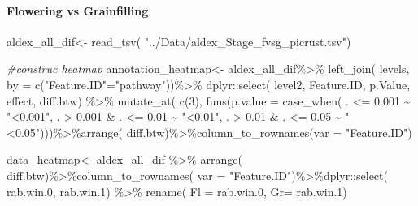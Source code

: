 \documentclass[]{interact}
\theoremstyle{plain}%
\theoremstyle{definition}
\theoremstyle{remark}
\newenvironment{Shaded}{\begin{snugshade}}{\end{snugshade}}
\newcommand{\AttributeTok}[1]{\textcolor[rgb]{0.77,0.63,0.00}{#1}}
\newcommand{\CommentTok}[1]{\textcolor[rgb]{0.56,0.35,0.01}{\textit{#1}}}
\newcommand{\DecValTok}[1]{\textcolor[rgb]{0.00,0.00,0.81}{#1}}
\newcommand{\FloatTok}[1]{\textcolor[rgb]{0.00,0.00,0.81}{#1}}
\newcommand{\FunctionTok}[1]{\textcolor[rgb]{0.00,0.00,0.00}{#1}}
\newcommand{\NormalTok}[1]{#1}
\newcommand{\OtherTok}[1]{\textcolor[rgb]{0.56,0.35,0.01}{#1}}
\newcommand{\SpecialCharTok}[1]{\textcolor[rgb]{0.00,0.00,0.00}{#1}}
\newcommand{\StringTok}[1]{\textcolor[rgb]{0.31,0.60,0.02}{#1}}
\begin{document}
\hypertarget{flowering-vs-grainfilling}{%
\paragraph{Flowering vs Grainfilling}\label{flowering-vs-grainfilling}}

\begin{Shaded}
\begin{Highlighting}[]
\NormalTok{aldex\_all\_dif}\OtherTok{\textless{}{-}} \FunctionTok{read\_tsv}\NormalTok{( }\StringTok{"../Data/aldex\_Stage\_fvsg\_picrust.tsv"}\NormalTok{)}


\CommentTok{\#construc heatmap}
\NormalTok{annotation\_heatmap}\OtherTok{\textless{}{-}}\NormalTok{ aldex\_all\_dif}\SpecialCharTok{\%\textgreater{}\%} \FunctionTok{left\_join}\NormalTok{(}
\NormalTok{  levels, }\AttributeTok{by =} \FunctionTok{c}\NormalTok{(}\StringTok{"Feature.ID"}\OtherTok{=}\StringTok{"pathway"}\NormalTok{))}\SpecialCharTok{\%\textgreater{}\%}\NormalTok{ dplyr}\SpecialCharTok{::}\FunctionTok{select}\NormalTok{(}
\NormalTok{  level2, Feature.ID, p.Value, effect, diff.btw) }\SpecialCharTok{\%\textgreater{}\%} \FunctionTok{mutate\_at}\NormalTok{(}
  \FunctionTok{c}\NormalTok{(}\DecValTok{3}\NormalTok{), }\FunctionTok{funs}\NormalTok{(}\AttributeTok{p.value =} \FunctionTok{case\_when}\NormalTok{(}
\NormalTok{  . }\SpecialCharTok{\textless{}=} \FloatTok{0.001} \SpecialCharTok{\textasciitilde{}} \StringTok{"\textless{}0.001"}\NormalTok{,}
\NormalTok{  . }\SpecialCharTok{\textgreater{}}  \FloatTok{0.001} \SpecialCharTok{\&}\NormalTok{ .  }\SpecialCharTok{\textless{}=} \FloatTok{0.01} \SpecialCharTok{\textasciitilde{}} \StringTok{"\textless{}0.01"}\NormalTok{,}
\NormalTok{  . }\SpecialCharTok{\textgreater{}}  \FloatTok{0.01} \SpecialCharTok{\&}\NormalTok{ .  }\SpecialCharTok{\textless{}=} \FloatTok{0.05} \SpecialCharTok{\textasciitilde{}} \StringTok{"\textless{}0.05"}\NormalTok{)))}\SpecialCharTok{\%\textgreater{}\%}\FunctionTok{arrange}\NormalTok{(}
\NormalTok{  diff.btw)}\SpecialCharTok{\%\textgreater{}\%}\FunctionTok{column\_to\_rownames}\NormalTok{(}\AttributeTok{var =} \StringTok{"Feature.ID"}\NormalTok{)}

\NormalTok{data\_heatmap}\OtherTok{\textless{}{-}}\NormalTok{ aldex\_all\_dif }\SpecialCharTok{\%\textgreater{}\%} \FunctionTok{arrange}\NormalTok{(}
\NormalTok{  diff.btw)}\SpecialCharTok{\%\textgreater{}\%}\FunctionTok{column\_to\_rownames}\NormalTok{(}
  \AttributeTok{var =} \StringTok{"Feature.ID"}\NormalTok{)}\SpecialCharTok{\%\textgreater{}\%}\NormalTok{dplyr}\SpecialCharTok{::}\FunctionTok{select}\NormalTok{(}
\NormalTok{  rab.win}\FloatTok{.0}\NormalTok{, rab.win}\FloatTok{.1}\NormalTok{) }\SpecialCharTok{\%\textgreater{}\%} \FunctionTok{rename}\NormalTok{(}
  \AttributeTok{Fl =}\NormalTok{ rab.win}\FloatTok{.0}\NormalTok{, }\AttributeTok{Gr=}\NormalTok{ rab.win}\FloatTok{.1}\NormalTok{)}


\end{Highlighting}
\end{Shaded}
\end{document}
